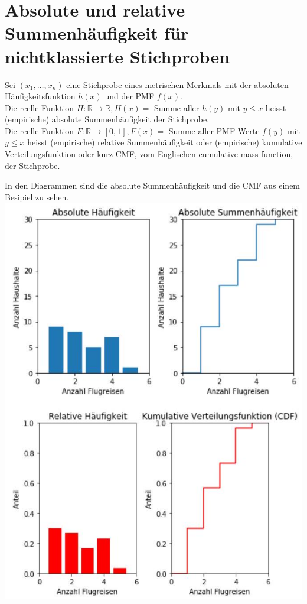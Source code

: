 \documentclass[10pt]{article}
\begin{document}
\section*{Absolute und relative Summenhäufigkeit für nichtklassierte Stichproben}
Sei $\left(x_{1}, \ldots, x_{n}\right)$ eine Stichprobe eines metrischen Merkmals mit der absoluten Häufigkeitsfunktion $h(x)$ und der PMF $f(x)$.\\
Die reelle Funktion $H: \mathbb{R} \rightarrow \mathbb{R}, H(x)=$ Summe aller $h(y)$ mit $y \leq x$ heisst (empirische) absolute Summenhäufigkeit der Stichprobe.\\
Die reelle Funktion $F: \mathbb{R} \rightarrow[0,1], F(x)=$ Summe aller PMF Werte $f(y)$ mit $y \leq x$ heisst (empirische) relative Summenhäufigkeit oder (empirische) kumulative Verteilungsfunktion oder kurz CMF, vom Englischen cumulative mass function, der Stichprobe.

In den Diagrammen sind die absolute Summenhäufigkeit und die CMF aus einem Besipiel zu sehen.\\
\includegraphics[width=\linewidth]{images/2025_01_02_7223f4748d9c61c6ce42g-2(2)}
\end{document}
